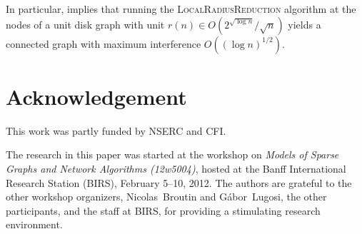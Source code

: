\documentclass{patmorin}
\begin{document}
In particular,  implies that running the
\textsc{LocalRadiusReduction} algorithm at the nodes of a unit disk graph
with unit $r(n)\in O(2^{\sqrt{\log n}}/\sqrt{n})$ yields a connected
graph with maximum interference $O((\log n)^{1/2})$.


\section*{Acknowledgement}

This work was partly funded by NSERC and CFI.

The research in this paper was started at the workshop on \emph{Models
of Sparse Graphs and Network Algorithms (12w5004)}, hosted at the Banff
International Research Station (BIRS), February 5--10, 2012.  The authors
are grateful to the other workshop organizers, Nicolas~Broutin and
G\'abor~Lugosi, the other participants, and the staff at BIRS, for
providing a stimulating research environment.



\end{document}
